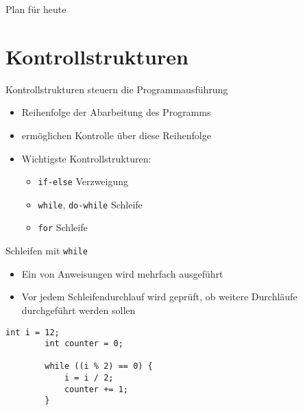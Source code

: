 \documentclass[10pt]{beamer} %
\date{}
\begin{document}
\maketitle

\begin{frame}{Plan für heute}

	\tableofcontents

\end{frame}

\section{Kontrollstrukturen}

\begin{frame}{Kontrollstrukturen steuern die Programmausführung}

	\begin{itemize}
		\item Reihenfolge der Abarbeitung des Programms \\\rto {}
		\item {} ermöglichen Kontrolle über diese Reihenfolge
		\item Wichtigste Kontrollstrukturen:
		\begin{itemize}
			\item \texttt{if-else} \rto Verzweigung
			\item \texttt{while}, \texttt{do-while} \rto Schleife
			\item \texttt{for} \rto Schleife
		\end{itemize}
	\end{itemize}

\end{frame}

\begin{frame}[fragile]{Schleifen mit \texttt{while}}

	\begin{itemize}
		\item Ein  von Anweisungen wird mehrfach ausgeführt
		\item Vor jedem Schleifendurchlauf wird geprüft, ob weitere Durchläufe durchgeführt werden sollen
		\\ \rto {}
	\end{itemize}
	
	\vspace{3ex}
	
	\begin{lstlisting}[gobble=4]
		int i = 12;
		int counter = 0;
		
		while ((i % 2) == 0) {
			i = i / 2;
			counter += 1;
		}
	\end{lstlisting}

\end{frame}
\end{document}
